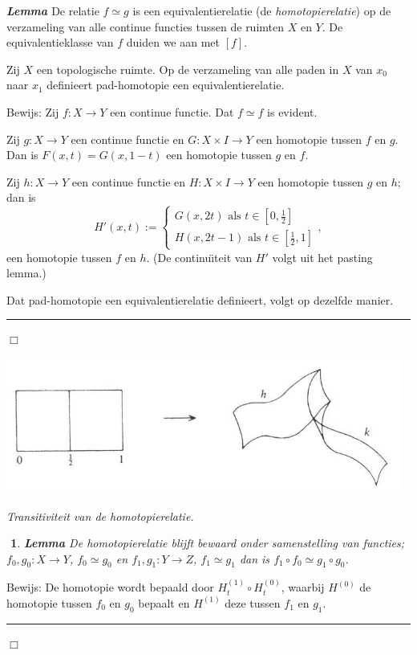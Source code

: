 \documentclass[12pt]{book}
\newcommand{\bew}{{\sc Bewijs: }}
\newcommand{\B}{\rule{1mm}{0mm} \hfill $\Box$ }
\newenvironment{lem}{\begin{lemh}{\em {\bf Lemma }}}{\end{lemh}}
\newtheorem{eigh}[stelh]{$\!\!$}
\newenvironment{eig}{\begin{eigh}{\em {\bf Lemma }}}{\end{eigh}}
\begin{document}
\begin{lem} De relatie $f\simeq g$ is een equivalentierelatie (de {\em homotopierelatie}) op de
verzameling van alle continue functies tussen de ruimten $X$ en $Y$. De equivalentieklasse van $f$
duiden we aan met $[f]$.

Zij $X$ een topologische ruimte. Op de verzameling van alle paden in $X$ van $x_0$ naar $x_1$ definieert pad-homotopie een equivalentierelatie.
\end{lem}
\bew Zij $f: X\to Y$ een continue functie. 
Dat $f\simeq f$ is evident. 

Zij $g:X\to Y$ een continue functie en $G:X\times I \to Y$ een homotopie tussen $f$ en $g$. Dan is
$F(x,t)=G(x, 1-t)$ een homotopie tussen $g$ en $f$.

Zij $h: X\to Y$ een continue functie en $H:X\times I \to Y$ een homotopie tussen $g$ en $h$; dan is
$$H'(x,t):=\left\{\begin{array}{l} G(x,2t) \mbox{ als } t\in [0, \frac{1}{2}] \\
H(x, 2t-1) \mbox{ als } t\in [\frac{1}{2}, 1]\end{array}\right.,$$
een homotopie tussen $f$ en $h$. (De continu\"{\i}teit van $H'$ volgt uit het pasting lemma.) 

Dat pad-homotopie een equivalentierelatie definieert, volgt op dezelfde manier.  
\B  

\begin{center}
\includegraphics[width=13cm]{images/transitief.jpg}

\vspace{3mm}
{\em Transitiviteit van de homotopierelatie.}
\end{center}

\begin{eig} De homotopierelatie blijft bewaard onder samenstelling van functies; $f_0, g_0:X\to Y$,
$f_0\simeq g_0$ en $f_1, g_1:Y\to Z$, $f_1\simeq g_1$ dan is $f_1\circ f_0\simeq g_1 \circ g_0$.
\end{eig}

\bew De homotopie wordt bepaald door $H_{t}^{(1)}\circ H_{t}^{(0)}$, waarbij $H^{(0)}$ de homotopie tussen $f_0$ en $g_0$ bepaalt en $H^{(1)}$ deze tussen $f_1$ en $g_1$. \B
\end{document}

